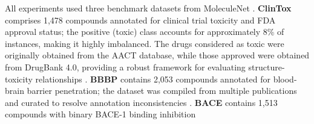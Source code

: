 All experiments used three benchmark datasets from MoleculeNet
\cite{wu2018moleculenet}. \textbf{ClinTox} \cite{gayvert2016datadriven} comprises 1,478
compounds annotated for clinical trial toxicity and FDA approval
status; the positive (toxic) class accounts for approximately 8\%
of instances, making it highly imbalanced. The drugs considered as
toxic were originally obtained from the AACT database, while those
approved were obtained from DrugBank 4.0, providing a robust
framework for evaluating structure-toxicity relationships
\cite{gayvert2016datadriven}. \textbf{BBBP} \cite{martins2012bayesian} contains 2,053 compounds
annotated for blood-brain barrier penetration; the dataset was
compiled from multiple publications and curated to resolve
annotation inconsistencies \cite{martins2012bayesian}. \textbf{BACE} \cite{subramanian2016computational}
contains 1,513 compounds with binary BACE-1 binding inhibition
 \cite{weininger1988smiles}

